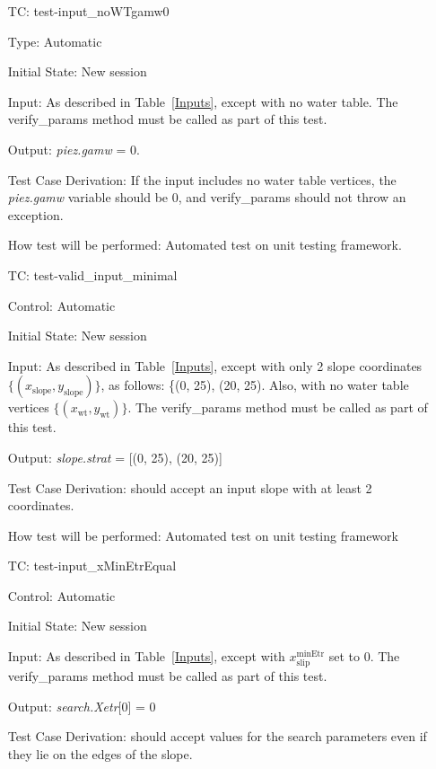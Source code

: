 \documentclass[12pt, titlepage]{article}
\newcounter{utestnum} %
\begin{document}
\begin{enumerate}[label=TC\arabic*:,ref={\arabic*}]
\item [TC\refstepcounter{utestnum}\theutestnum: \label{TC_Inputgamw0NoWT}] 
test-input\_noWTgamw0

Type: Automatic

Initial State: New session

Input: As described in Table~\ref{Inputs}, except with no water table. The 
verify\_params method must be called as part of this test.

Output: \textit{piez.gamw} = 0.

Test Case Derivation: If the input includes no water table vertices, the 
\textit{piez.gamw} variable should be 0, and verify\_params should not throw an 
exception.

How test will be performed: Automated test on unit testing framework.

\item [TC\refstepcounter{utestnum}\theutestnum: \label{TC_InputMin}] 
test-valid\_input\_minimal

Control: Automatic

Initial State: New session

Input: As described in Table~\ref{Inputs}, except with only 
2 slope coordinates $\{\left(x_\text{slope},y_\text{slope}\right)\}$, as 
follows: 
\{(0, 25), (20, 25). Also, with no water table vertices 
$\{\left(x_\text{wt},y_\text{wt}\right)\}$.  The verify\_params method must be 
called as part of this test.

Output: \textit{slope.strat} = [(0, 25), (20, 25)]

Test Case Derivation: \progname{} should accept an input slope with at least 2 
coordinates.

How test will be performed: Automated test on unit testing framework

\item [TC\refstepcounter{utestnum}\theutestnum: \label{TC_InputXMinEtrEqual}] 
test-input\_xMinEtrEqual

Control: Automatic

Initial State: New session

Input: As described in Table~\ref{Inputs}, except with  
${x_\text{slip}^\text{minEtr}}$ set to 0.  The verify\_params method must be 
called as part of this test.

Output: \textit{search.Xetr}[0] = 0

Test Case Derivation: \progname{} should accept values for the search 
parameters even if they lie on the edges of the slope.


\end{enumerate}
\end{document}

